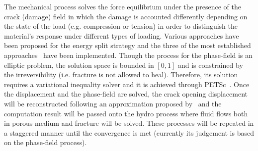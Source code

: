 The mechanical process solves the force equilibrium under the presence of the crack (damage) field in which the damage is accounted differently depending on the state of the load (e.g. compression or tension) in order to distinguish the material's response under different types of loading.
Various approaches have been proposed for the energy split strategy and the three of the most established approaches~\cite{Amor2009,Miehe2010a,Freddi2010} have been implemented.
Though the process for the phase-field is an elliptic problem, the solution space is bounded in $[0,1]$ and is constrained by the irreversibility (i.e. fracture is not allowed to heal).
Therefore, its solution requires a variational inequality solver and it is achieved through PETSc~\cite{petsc-user-ref, petsc-web-page}.
Once the displacement and the phase-field are solved, the crack opening displacement will be reconstructed following an approximation proposed by~\cite{Yoshioka2020} and the computation result will be passed onto the hydro process where fluid flows both in porous medium and fracture will be solved.
These processes will be repeated in a staggered manner until the convergence is met (currently its judgement is based on the phase-field process).
